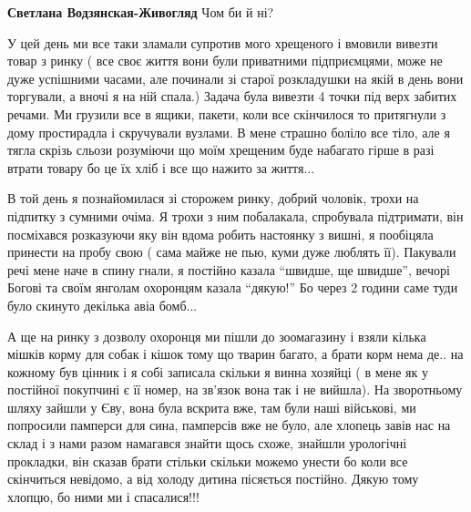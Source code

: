 \begin{itemize} %
\textbf{Светлана Водзянская-Живогляд} Чом би й ні?


У цей день ми все таки зламали супротив мого хрещеного і вмовили вивезти товар
з ринку ( все своє життя вони були приватними підприємцями, може не дуже
успішними часами, але починали зі старої розкладушки на якій в день вони
торгували, а вночі я на ній спала.) Задача була вивезти 4 точки під верх
забитих речами. Ми грузили все в ящики, пакети, коли все скінчилося то
притягнули з дому простирадла і скручували вузлами. В мене страшно боліло все
тіло, але я тягла скрізь сльози розуміючи що моїм хрещеним буде набагато гірше
в разі втрати товару бо це їх хліб і все що нажито за життя...


В той день я познайомилася зі сторожем ринку, добрий чоловік, трохи на підпитку
з сумними очіма. Я трохи з ним побалакала, спробувала підтримати, він
посміхався розказуючи яку він вдома робить настоянку з вишні, я пообіцяла
принести на пробу свою ( сама майже не пью, куми дуже люблять її). Пакували
речі мене наче в спину гнали, я постійно казала \enquote{швидше, ще швидше}, вечорі
Богові та своїм янголам охоронцям казала \enquote{дякую!} Бо через 2 години саме туди
було скинуто декілька авіа бомб...


А ще на ринку з дозволу охоронця ми пішли до зоомагазину і взяли кілька мішків
корму для собак і кішок тому що тварин багато, а брати корм нема де.. на
кожному був цінник і я собі записала скільки я винна хозяйці ( в мене як у
постійної покупчині є її номер, на зв'язок вона так і не вийшла). На
зворотньому шляху зайшли у Єву, вона була вскрита вже, там були наші військові,
ми попросили памперси для сина, памперсів вже не було, але хлопець завів нас на
склад і з нами разом намагався знайти щось схоже, знайшли урологічні прокладки,
він сказав брати стільки скільки можемо унести бо коли все скінчиться невідомо,
а від холоду дитина пісяється постійно. Дякую тому хлопцю, бо ними ми і
спасалися!!!

\end{itemize} %
